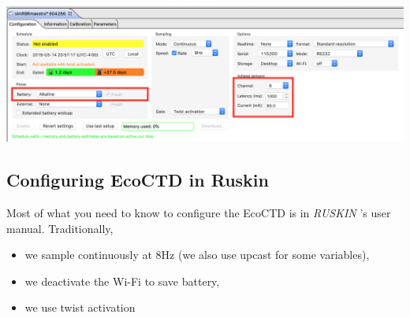 \documentclass[13pt]{article}
\newcommand{\ruskin}{\textit{RUSKIN }}
\begin{document}
\begin{center}
    \includegraphics[width = .5\linewidth]{EcoCTD_simulation2.png}
\end{center}

\subsection{Configuring EcoCTD in Ruskin}
Most of what you need to know to configure the EcoCTD is in \ruskin's user manual. Traditionally, \begin{itemize}
    \item we sample continuously at 8Hz (we also use upcast for some variables), 
    \item we deactivate the Wi-Fi to save battery, 
    \item we use twist activation
\end{itemize}
\end{document}
